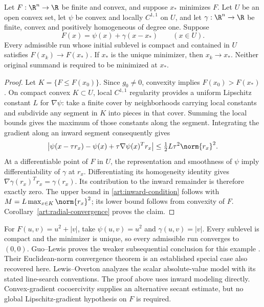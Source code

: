\begin{theorem}\label{art:centered}
Let $F:\R^n\to\R$ be finite and convex, and suppose $x_*$ minimizes $F$.
Let $U$ be an open convex set, let $\psi$ be convex and locally $C^{1,1}$ on
$U$, and let $\gamma:\R^n\to\R$ be finite, convex and positively homogeneous
of degree one. Suppose
\[
 F(x)=\psi(x)+\gamma(x-x_*)\qquad(x\in U).
\]
Every admissible run whose initial sublevel is compact and contained in $U$
satisfies $F(x_k)\to F(x_*)$. If $x_*$ is the unique minimizer, then
$x_k\to x_*$. Neither original summand is required to be minimized at $x_*$.
\end{theorem}
\begin{proof}
Let $K=\{F\le F(x_0)\}$. Since $g_0\ne0$, convexity implies
$F(x_0)>F(x_*)$. On compact convex $K\subset U$, local $C^{1,1}$ regularity
provides a uniform Lipschitz constant $L$ for $\nabla\psi$: take a finite
cover by neighborhoods carrying local constants and subdivide any segment in
$K$ into pieces in that cover. Summing the local bounds gives the maximum
of those constants along the segment. Integrating the gradient along an
inward segment consequently gives
\[
 \left|\psi(x-\tau r_x)-\psi(x)
             +\tau\nabla\psi(x)^Tr_x\right|
 \le\tfrac12L\tau^2\norm{r_x}^2.
\]
At a differentiable point of $F$ in $U$, the representation and smoothness of
$\psi$ imply differentiability of $\gamma$ at $r_x$. Differentiating its
homogeneity identity gives $\nabla\gamma(r_x)^Tr_x=\gamma(r_x)$.
Its contribution to the inward remainder is therefore exactly zero.
The upper bound in \eqref{art:inward-condition} follows with
$M=L\max_{x\in K}\norm{r_x}^2$; its lower bound follows from convexity of $F$.
Corollary~\ref{art:radial-convergence} proves the claim.
\end{proof}

For $F(u,v)=u^2+|v|$, take $\psi(u,v)=u^2$ and $\gamma(u,v)=|v|$.
Every sublevel is compact and the minimizer is unique, so every admissible
run converges to $(0,0)$. Guo--Lewis proves the weaker subsequential conclusion
for this example \cite[Corollary~4.4]{GL18}. Their Euclidean-norm convergence
theorem \cite[Corollary~4.2]{GL18} is an established special case also recovered
here. Lewis--Overton \cite[Section~5.1]{LO} analyzes the scalar absolute-value
model with its stated line-search conventions.
The proof above uses inward modeling directly. Convex-gradient cocoercivity
\cite{WW} supplies an alternative secant estimate, but no global
Lipschitz-gradient hypothesis on $F$ is required.

